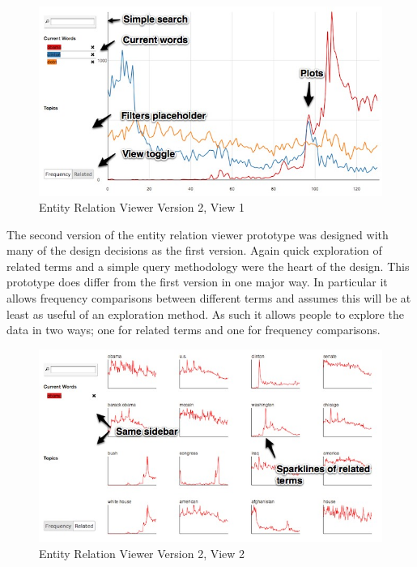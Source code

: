 \begin{figure}[htb]
  \centerline{
    \includegraphics[scale=0.37]{figures/relation-1-a.jpg}
  }
  \caption{Entity Relation Viewer Version 2, View 1}
  \label{fig:explorer-1-a}
\end{figure}

The second version of the entity relation viewer prototype was designed with many of the design decisions as the first version. Again quick exploration of related terms and a simple query  methodology were the heart of the design. This prototype does differ from the first version in one major way. In particular it allows frequency comparisons between different terms and assumes this will be at least as useful of an exploration method. As such it allows people to explore the data in two ways; one for related terms and one for frequency comparisons.


\begin{figure}[htb]
  \centerline{
    \includegraphics[scale=0.37]{figures/relation-1-b.jpg}
  }
  \caption{Entity Relation Viewer Version 2, View 2}
  \label{fig:explorer-1-b}
\end{figure}
